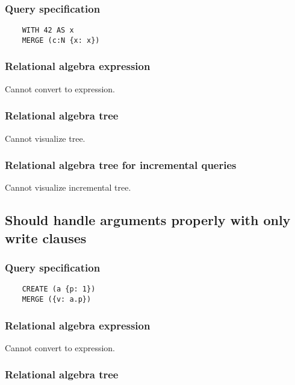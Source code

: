 	\subsubsection*{Query specification}

	\begin{lstlisting}
	WITH 42 AS x
	MERGE (c:N {x: x})
	\end{lstlisting}


	\subsubsection*{Relational algebra expression}

	Cannot convert to expression.

	\subsubsection*{Relational algebra tree}

	Cannot visualize tree.

	\subsubsection*{Relational algebra tree for incremental queries}

	Cannot visualize incremental tree.
	\subsection{Should handle arguments properly with only write clauses}

	\subsubsection*{Query specification}

	\begin{lstlisting}
	CREATE (a {p: 1})
	MERGE ({v: a.p})
	\end{lstlisting}


	\subsubsection*{Relational algebra expression}

	Cannot convert to expression.

	\subsubsection*{Relational algebra tree}


